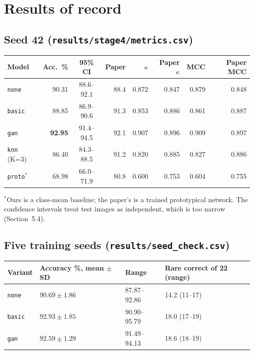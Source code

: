 \documentclass[10pt,a4paper]{article}
\begin{document}
\section{Results of record}

\subsection{Seed 42 (\texttt{results/stage4/metrics.csv})}

\noindent
\begin{tabularx}{\linewidth}{@{}l r c r r r r r@{}}
\toprule
Model & Acc.\ \% & 95\% CI & Paper & $\kappa$ & Paper $\kappa$ & MCC & Paper MCC \\
\midrule
\texttt{none}  & 90.31 & 88.6--92.1 & 88.4 & 0.872 & 0.847 & 0.879 & 0.848 \\
\texttt{basic} & 88.85 & 86.9--90.6 & 91.3 & 0.853 & 0.886 & 0.861 & 0.887 \\
\texttt{gan}   & \textbf{92.95} & 91.4--94.5 & 92.1 & 0.907 & 0.896 & 0.909 & 0.897 \\
\texttt{knn} (K=3) & 86.40 & 84.3--88.5 & 91.2 & 0.820 & 0.885 & 0.827 & 0.886 \\
\texttt{proto}$^\ast$ & 68.98 & 66.0--71.9 & 80.8 & 0.600 & 0.753 & 0.604 & 0.755 \\
\bottomrule
\end{tabularx}

\smallskip
{\footnotesize $^\ast$Ours is a class-mean baseline; the paper's is a trained prototypical
network. The confidence intervals treat test images as independent, which is too narrow
(Section~5.4).\par}

\subsection{Five training seeds (\texttt{results/seed\_check.csv})}

\noindent
\begin{tabularx}{\linewidth}{@{}l Y Y Y@{}}
\toprule
Variant & Accuracy \%, mean $\pm$ SD & Range & Rare correct of 22 (range) \\
\midrule
\texttt{none}  & $90.69 \pm 1.86$ & 87.87--92.86 & 14.2 (11--17) \\
\texttt{basic} & $92.93 \pm 1.85$ & 90.90--95.79 & 18.0 (17--19) \\
\texttt{gan}   & $92.59 \pm 1.29$ & 91.49--94.13 & 18.6 (18--19) \\
\bottomrule
\end{tabularx}
\end{document}
